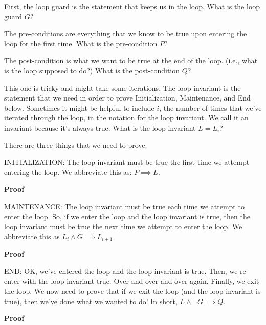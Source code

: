 \documentclass{article}
\begin{document}
First, the loop guard is the statement that keeps us in the loop.
What is the loop guard $G$?
\vspace{0.5in}

The pre-conditions are everything that we know to be true upon entering the loop
for the first time.
What is the pre-condition $P$?
\vspace{0.5in}

The post-condition is what we want to be true at the end of the loop.  (i.e.,
what is the loop supposed to do?)
What is the post-condition $Q$?
\vspace{0.5in}

This one is tricky and might take some iterations.
The loop invariant is the statement that we need in order to prove
Initialization, Maintenance, and End below. Sometimes it might be helpful to
include $i$, the number of times that we've iterated through the loop, in the
notation for the loop invariant.  We call it an invariant because it's always
true.
What is the loop invariant $L=L_i$?
\vspace{0.5in}


There are three things that we need to prove.

INITIALIZATION: The loop invariant must be true the first time we attempt
entering the loop.  We abbreviate this as: $P \implies L$.

\textbf{Proof}
\vspace{2in}

MAINTENANCE: The loop invariant must be true each time we attempt to enter the
loop.  So, if we enter the loop and the loop invariant is true, then the loop
invariant must be true the next time we attempt to enter the loop.  We
abbreviate this as $L_i \wedge G \implies L_{i+1}$.

\textbf{Proof}
\vspace{3in}

END: OK, we've entered the loop and the loop invariant is true. Then, we
re-enter with the loop invariant true. Over and over and over again.  Finally,
we exit the loop.  We now need to prove that if we exit the loop (and the loop
invariant is true), then we've done what we wanted to do! In short, $L \wedge
\neg G \implies Q$.

\textbf{Proof}
\vspace{2in}
\end{document}
